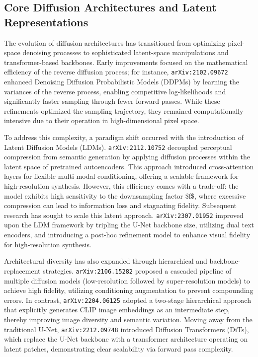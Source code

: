 \documentclass[11pt]{article}
\begin{document}
\subsection{Core Diffusion Architectures and Latent Representations}

The evolution of diffusion architectures has transitioned from optimizing pixel-space denoising processes to sophisticated latent-space manipulations and transformer-based backbones. Early improvements focused on the mathematical efficiency of the reverse diffusion process; for instance, \texttt{arXiv:2102.09672} enhanced Denoising Diffusion Probabilistic Models (DDPMs) by learning the variances of the reverse process, enabling competitive log-likelihoods and significantly faster sampling through fewer forward passes. While these refinements optimized the sampling trajectory, they remained computationally intensive due to their operation in high-dimensional pixel space.

To address this complexity, a paradigm shift occurred with the introduction of Latent Diffusion Models (LDMs). \texttt{arXiv:2112.10752} decoupled perceptual compression from semantic generation by applying diffusion processes within the latent space of pretrained autoencoders. This approach introduced cross-attention layers for flexible multi-modal conditioning, offering a scalable framework for high-resolution synthesis. However, this efficiency comes with a trade-off: the model exhibits high sensitivity to the downsampling factor \$f\$, where excessive compression can lead to information loss and stagnating fidelity. Subsequent research has sought to scale this latent approach. \texttt{arXiv:2307.01952} improved upon the LDM framework by tripling the U-Net backbone size, utilizing dual text encoders, and introducing a post-hoc refinement model to enhance visual fidelity for high-resolution synthesis.

Architectural diversity has also expanded through hierarchical and backbone-replacement strategies. \texttt{arXiv:2106.15282} proposed a cascaded pipeline of multiple diffusion models (low-resolution followed by super-resolution models) to achieve high fidelity, utilizing conditioning augmentation to prevent compounding errors. In contrast, \texttt{arXiv:2204.06125} adopted a two-stage hierarchical approach that explicitly generates CLIP image embeddings as an intermediate step, thereby improving image diversity and semantic variation. Moving away from the traditional U-Net, \texttt{arXiv:2212.09748} introduced Diffusion Transformers (DiTs), which replace the U-Net backbone with a transformer architecture operating on latent patches, demonstrating clear scalability via forward pass complexity.
\end{document}

